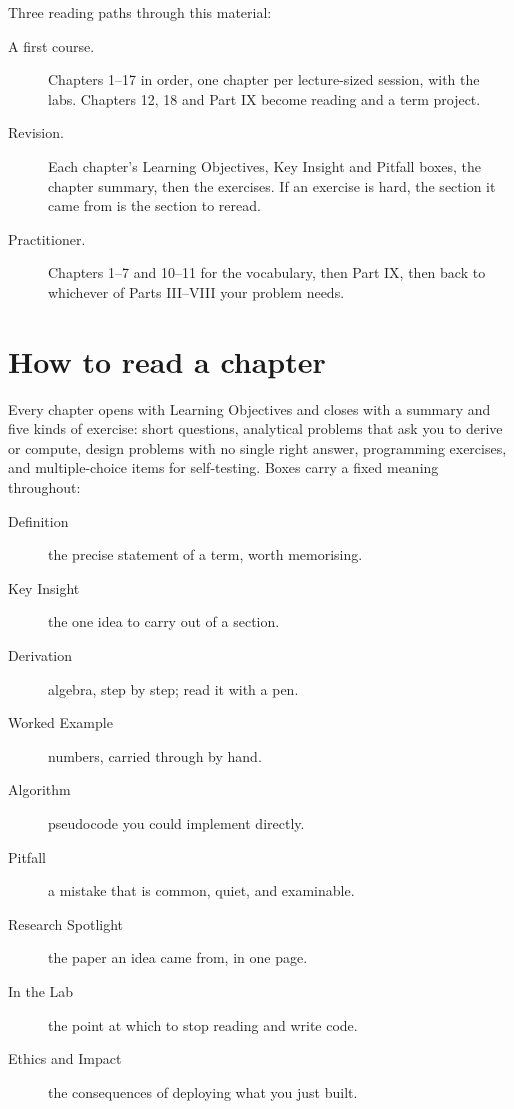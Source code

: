 Three reading paths through this material:

\begin{description}
  \item[A first course.] Chapters 1--17 in order, one chapter per lecture-sized
    session, with the labs. Chapters 12, 18 and Part IX become reading and a
    term project.
  \item[Revision.] Each chapter's Learning Objectives, Key Insight and Pitfall
    boxes, the chapter summary, then the exercises. If an exercise is hard, the
    section it came from is the section to reread.
  \item[Practitioner.] Chapters 1--7 and 10--11 for the vocabulary, then
    Part IX, then back to whichever of Parts III--VIII your problem needs.
\end{description}

\section*{How to read a chapter}

Every chapter opens with Learning Objectives and closes with a summary and five
kinds of exercise: short questions, analytical problems that ask you to derive or
compute, design problems with no single right answer, programming exercises, and
multiple-choice items for self-testing. Boxes carry a fixed meaning throughout:

\begin{description}
  \item[Definition] the precise statement of a term, worth memorising.
  \item[Key Insight] the one idea to carry out of a section.
  \item[Derivation] algebra, step by step; read it with a pen.
  \item[Worked Example] numbers, carried through by hand.
  \item[Algorithm] pseudocode you could implement directly.
  \item[Pitfall] a mistake that is common, quiet, and examinable.
  \item[Research Spotlight] the paper an idea came from, in one page.
  \item[In the Lab] the point at which to stop reading and write code.
  \item[Ethics and Impact] the consequences of deploying what you just built.
\end{description}

